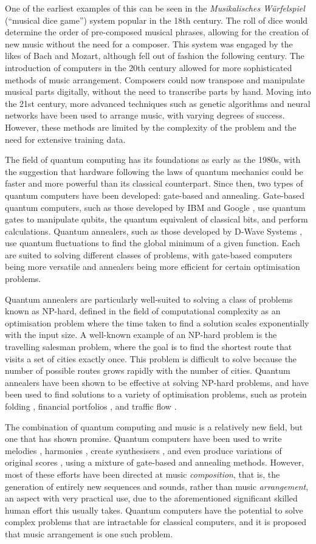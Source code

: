 \documentclass[12pt]{article}
\begin{document}
One of the earliest examples of this can be seen in the \textit{Musikalisches Würfelspiel} (``musical dice game'') system popular in the 18th century. The roll of dice would determine the order of pre-composed musical phrases, allowing for the creation of new music without the need for a composer. This system was engaged by the likes of Bach and Mozart, although fell out of fashion the following century.
The introduction of computers in the 20th century allowed for more sophisticated methods of music arrangement. Composers could now transpose and manipulate musical parts digitally, without the need to transcribe parts by hand. Moving into the 21st century, more advanced techniques such as genetic algorithms and neural networks have been used to arrange music, with varying degrees of success. However, these methods are limited by the complexity of the problem and the need for extensive training data.

The field of quantum computing has its foundations as early as the 1980s, with the suggestion that hardware following the laws of quantum mechanics could be faster and more powerful than its classical counterpart. Since then, two types of quantum computers have been developed: gate-based and annealing. Gate-based quantum computers, such as those developed by IBM  and Google , use quantum gates to manipulate qubits, the quantum equivalent of classical bits, and perform calculations. Quantum annealers, such as those developed by D-Wave Systems , use quantum fluctuations to find the global minimum of a given function. Each are suited to solving different classes of problems, with gate-based computers being more versatile and annealers being more efficient for certain optimisation problems. 

Quantum annealers are particularly well-suited to solving a class of problems known as NP-hard, defined in the field of computational complexity as an optimisation problem where the time taken to find a solution scales exponentially with the input size. A well-known example of an NP-hard problem is the travelling salesman problem, where the goal is to find the shortest route that visits a set of cities exactly once. This problem is difficult to solve because the number of possible routes grows rapidly with the number of cities. Quantum annealers have been shown to be effective at solving NP-hard problems, and have been used to find solutions to a variety of optimisation problems, such as protein folding , financial portfolios , and traffic flow .

The combination of quantum computing and music is a relatively new field, but one that has shown promise. Quantum computers have been used to write melodies , harmonies , create synthesisers , and even produce variations of original scores , using a mixture of gate-based and annealing methods. However, most of these efforts have been directed at music \textit{composition}, that is, the generation of entirely new sequences and sounds, rather than music \textit{arrangement}, an aspect with very practical use, due to the aforementioned significant skilled human effort this usually takes. Quantum computers have the potential to solve complex problems that are intractable for classical computers, and it is proposed that music arrangement is one such problem.
\end{document}
